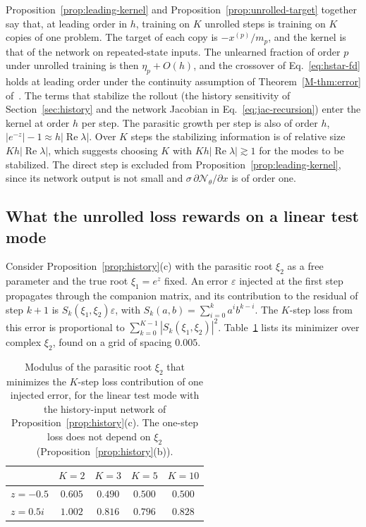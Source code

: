 \documentclass[11pt]{article}
\newcommand{\Mref}[1]{\ref{M-#1} of~\cite{main}}
\theoremstyle{definition}
\theoremstyle{remark}
\newcommand{\Net}{\mathcal{N}_\theta}
\begin{document}
Proposition~\ref{prop:leading-kernel} and Proposition~\ref{prop:unrolled-target} together say that, at leading order in $h$, training on $K$ unrolled steps is training on $K$ copies of one problem.
The target of each copy is $-x^{(p)}/m_p$, and the kernel is that of the network on repeated-state inputs.
The unlearned fraction of order $p$ under unrolled training is then $\eta_p + O(h)$, and the crossover of Eq.~\eqref{eq:hstar-fd} holds at leading order under the continuity assumption of Theorem~\Mref{thm:error}.
The terms that stabilize the rollout (the history sensitivity of Section~\ref{sec:history} and the network Jacobian in Eq.~\eqref{eq:jac-recursion}) enter the kernel at order $h$ per step.
The parasitic growth per step is also of order $h$, $|e^{-z}| - 1 \approx h|\operatorname{Re}\lambda|$.
Over $K$ steps the stabilizing information is of relative size $Kh|\operatorname{Re}\lambda|$, which suggests choosing $K$ with $Kh|\operatorname{Re}\lambda| \gtrsim 1$ for the modes to be stabilized.
The direct step is excluded from Proposition~\ref{prop:leading-kernel}, since its network output is not small and $\sigma\,\partial\Net/\partial x$ is of order one.

\subsection{What the unrolled loss rewards on a linear test mode}\label{sec:minimizer}

Consider Proposition~\ref{prop:history}(c) with the parasitic root $\xi_2$ as a free parameter and the true root $\xi_1 = e^z$ fixed.
An error $\varepsilon$ injected at the first step propagates through the companion matrix, and its contribution to the residual of step $k+1$ is $S_k(\xi_1, \xi_2)\varepsilon$, with $S_k(a, b) = \sum_{i=0}^ka^ib^{k-i}$.
The $K$-step loss from this error is proportional to $\sum_{k=0}^{K-1}|S_k(\xi_1, \xi_2)|^2$.
Table~\ref{tab:minimizer} lists its minimizer over complex $\xi_2$, found on a grid of spacing $0.005$.

\begin{table}[htbp]
\centering
\begin{tabular}{@{}lcccc@{}}
\toprule
& $K = 2$ & $K = 3$ & $K = 5$ & $K = 10$ \\
\midrule
$z = -0.5$ & $0.605$ & $0.490$ & $0.500$ & $0.500$ \\
$z = 0.5i$ & $1.002$ & $0.816$ & $0.796$ & $0.828$ \\
\bottomrule
\end{tabular}
\caption{Modulus of the parasitic root $\xi_2$ that minimizes the $K$-step loss contribution of one injected error, for the linear test mode with the history-input network of Proposition~\ref{prop:history}(c). The one-step loss does not depend on $\xi_2$ (Proposition~\ref{prop:history}(b)).}
\label{tab:minimizer}
\end{table}
\end{document}
